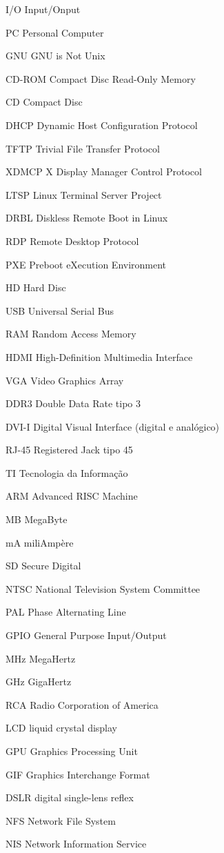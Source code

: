 \documentclass[
	12pt,				%
	openright,			%
	twoside,			%
	a4paper,			%
	chapter=TITLE,		%
	english,			%
	brazil				%
	]{abntex2}
\begin{document}
\begin{siglas}						
  \item[I/O] Input/Onput
  \item[PC] Personal Computer
  \item[GNU] GNU is Not Unix
  \item[CD-ROM] Compact Disc Read-Only Memory
  \item[CD] Compact Disc
  \item[DHCP] Dynamic Host Configuration Protocol
  \item[TFTP] Trivial File Transfer Protocol 
  \item[XDMCP] X Display Manager Control Protocol
  \item[LTSP] Linux Terminal Server Project
  \item[DRBL] Diskless Remote Boot in Linux
  \item[RDP] Remote Desktop Protocol
  \item[PXE] Preboot eXecution Environment
  \item[HD] Hard Disc
  \item[USB] Universal Serial Bus
  \item[RAM] Random Access Memory
  \item[HDMI] High-Definition Multimedia Interface
  \item[VGA] Video Graphics Array
  \item[DDR3] Double Data Rate tipo 3
  \item[DVI-I] Digital Visual Interface (digital e analógico)
  \item[RJ-45] Registered Jack tipo 45
  \item[TI] Tecnologia da Informação
  \item[ARM] Advanced RISC Machine
  \item[MB] MegaByte 
  \item[mA] miliAmpère
  \item[SD] Secure Digital
  \item[NTSC] National Television System Committee
  \item[PAL] Phase Alternating Line
  \item[GPIO] General Purpose Input/Output
  \item[MHz] MegaHertz
  \item[GHz] GigaHertz
  \item[RCA] Radio Corporation of America
  \item[LCD] liquid crystal display
  \item[GPU] Graphics Processing Unit
  \item[GIF] Graphics Interchange Format
  \item[DSLR] digital single-lens reflex 
  \item[NFS] Network File System
  \item[NIS] Network Information Service


\end{siglas}
\end{document}
